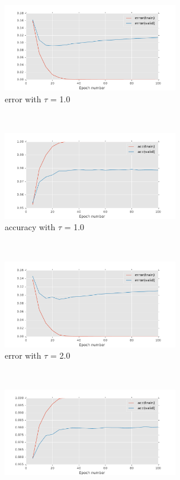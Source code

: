 \documentclass[11pt]{article}
\begin{document}
\begin{figure}[t!]
    \centering
    \begin{subfigure}[t]{0.45\textwidth}
        \centering
        \includegraphics[height=1.5in]{error_with_tau_1_0.pdf}
        \caption{error with $\tau$ = 1.0}
    \end{subfigure}   
    ~
    \begin{subfigure}[t]{0.45\textwidth}
        \centering
        \includegraphics[height=1.5in]{acc_with_tau_1_0.pdf}
        \caption{accuracy with $\tau$ = 1.0}
    \end{subfigure}   
    ~
    \begin{subfigure}[t]{0.45\textwidth}
        \centering
        \includegraphics[height=1.5in]{error_with_tau_2_0.pdf}
        \caption{error with $\tau$ = 2.0}
    \end{subfigure}   
    ~
    \begin{subfigure}[t]{0.45\textwidth}
        \centering
        \includegraphics[height=1.5in]{acc_with_tau_2_0.pdf}

\end{subfigure}
\end{figure}
\end{document}
